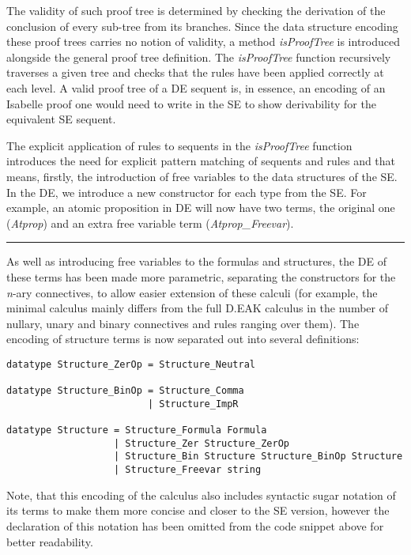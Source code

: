 \documentclass[]{article}
\begin{document}
The validity of such proof tree is determined by checking the derivation
of the conclusion of every sub-tree from its branches. Since the data
structure encoding these proof trees carries no notion of validity, a
method \emph{isProofTree} is introduced alongside the general proof tree
definition. The \emph{isProofTree} function recursively traverses a
given tree and checks that the rules have been applied correctly at each
level. A valid proof tree of a DE sequent is, in essence, an encoding of
an Isabelle proof one would need to write in the SE to show derivability
for the equivalent SE sequent.

The explicit application of rules to sequents in the \emph{isProofTree}
function introduces the need for explicit pattern matching of sequents
and rules and that means, firstly, the introduction of free variables to
the data structures of the SE.\\ In the DE, we introduce a new
constructor for each type from the SE. For example, an atomic
proposition in DE will now have two terms, the original one
(\emph{Atprop}) and an extra free variable term
(\emph{Atprop\_Freevar}).

\begin{center}\rule{3in}{0.4pt}\end{center}

As well as introducing free variables to the formulas and structures,
the DE of these terms has been made more parametric, separating the
constructors for the \emph{n}-ary connectives, to allow easier extension
of these calculi (for example, the minimal calculus mainly differs from
the full D.EAK calculus in the number of nullary, unary and binary
connectives and rules ranging over them). The encoding of structure
terms is now separated out into several definitions:

\begin{verbatim}
datatype Structure_ZerOp = Structure_Neutral
 
datatype Structure_BinOp = Structure_Comma
                         | Structure_ImpR

datatype Structure = Structure_Formula Formula
                   | Structure_Zer Structure_ZerOp
                   | Structure_Bin Structure Structure_BinOp Structure
                   | Structure_Freevar string
\end{verbatim}

Note, that this encoding of the calculus also includes syntactic sugar
notation of its terms to make them more concise and closer to the SE
version, however the declaration of this notation has been omitted from
the code snippet above for better readability.
\end{document}
